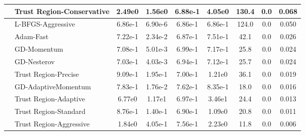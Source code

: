 \documentclass{article}
\begin{document}
\begin{longtable}{|l|l|c|c|c|c|c|c|c|}
\hline
 & Trust Region-Conservative & 2.49e0 & 1.56e0 & 6.88e-1 & 4.05e0 & 130.4 & 0.0 & 0.068 \\
\hline
 & L-BFGS-Aggressive & 6.86e-1 & 6.90e-6 & 6.86e-1 & 6.86e-1 & 124.0 & 0.0 & 0.050 \\
\hline
 & Adam-Fast & 7.22e-1 & 2.34e-2 & 6.87e-1 & 7.51e-1 & 42.1 & 0.0 & 0.026 \\
\hline
 & GD-Momentum & 7.08e-1 & 5.01e-3 & 6.99e-1 & 7.17e-1 & 25.8 & 0.0 & 0.024 \\
\hline
 & GD-Nesterov & 7.03e-1 & 4.03e-3 & 6.94e-1 & 7.12e-1 & 25.7 & 0.0 & 0.024 \\
\hline
 & Trust Region-Precise & 9.09e-1 & 1.95e-1 & 7.00e-1 & 1.21e0 & 36.1 & 0.0 & 0.019 \\
\hline
 & GD-AdaptiveMomentum & 7.83e-1 & 1.76e-2 & 7.62e-1 & 8.35e-1 & 18.0 & 0.0 & 0.016 \\
\hline
 & Trust Region-Adaptive & 6.77e0 & 1.17e1 & 6.97e-1 & 3.46e1 & 24.4 & 0.0 & 0.013 \\
\hline
 & Trust Region-Standard & 8.76e-1 & 1.40e-1 & 6.90e-1 & 1.09e0 & 20.8 & 0.0 & 0.011 \\
\hline
 & Trust Region-Aggressive & 1.84e0 & 4.05e-1 & 7.56e-1 & 2.23e0 & 11.8 & 0.0 & 0.006 \\
\end{longtable}
\end{document}
